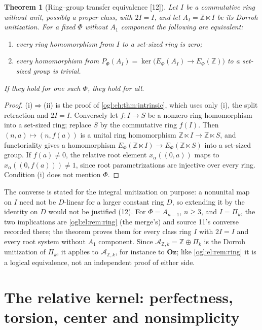 \documentclass[11pt,oneside]{article}
\numberwithin{equation}{section}
\newtheorem{theorem}{Theorem}[section]
\theoremstyle{definition}
\theoremstyle{remark}
\newcommand{\Oz}{\mathbf{Oz}}
\newcommand{\Z}{\mathbb Z}
\newcommand{\A}{\mathcal A}
\newcommand{\src}[1]{\textup{\textsf{\small[#1]}}}
\begin{document}
\begin{theorem}[Ring--group transfer equivalence \src{12}]\label{ogl:ch:thm:equivalence}
Let $I$ be a commutative ring without unit, possibly a proper class, with
$2I=I$, and let $A_I=\Z\ltimes I$ be its Dorroh unitization. For a fixed $\Phi$
without $A_1$ component the following are equivalent:
\begin{enumerate}
\item every ring homomorphism from $I$ to a set-sized ring is zero;
\item every homomorphism from $P_\Phi(A_I)=\ker\bigl(E_\Phi(A_I)\to E_\Phi(\Z)\bigr)$ to a
set-sized group is trivial.
\end{enumerate}
If they hold for one such $\Phi$, they hold for all.
\end{theorem}
\begin{proof}
(i)$\Rightarrow$(ii) is the proof of \cref{ogl:ch:thm:intrinsic}, which uses
only (i), the split retraction and $2I=I$. Conversely let $f:I\to S$ be a
nonzero ring homomorphism into a set-sized ring; replace $S$ by the
commutative ring $f(I)$. Then $(n,a)\mapsto(n,f(a))$ is a unital ring
homomorphism $\Z\ltimes I\to\Z\ltimes S$, and functoriality gives a homomorphism
$E_\Phi(\Z\ltimes I)\to E_\Phi(\Z\ltimes S)$ into a set-sized group. If
$f(a)\ne0$, the relative root element $x_\alpha((0,a))$ maps to
$x_\alpha((0,f(a)))\ne1$, since root parametrizations are injective over every
ring. Condition (i) does not mention $\Phi$.
\end{proof}

The converse is stated for the integral unitization on purpose: a nonunital map
on $I$ need not be $D$-linear for a larger constant ring $D$, so extending it by
the identity on $D$ would not be justified (12). For $\Phi=A_{n-1}$, $n\ge3$,
and $I=\Pi_k$, the two implications are \cref{ogl:el:rem:ring} (the merge's)
and source 11's converse recorded there; the theorem proves them for every
class ring $I$ with $2I=I$ and every root system without $A_1$ component.
Since $\A_{\Z,k}=\Z\oplus\Pi_k$ is the Dorroh unitization of $\Pi_k$, it applies
to $\A_{\Z,k}$, for instance to $\Oz$; like \cref{ogl:el:rem:ring} it is a
logical equivalence, not an independent proof of either side.

\section{The relative kernel: perfectness, torsion, center and nonsimplicity}\label{ogl:ch:sec:structure}
\end{document}
